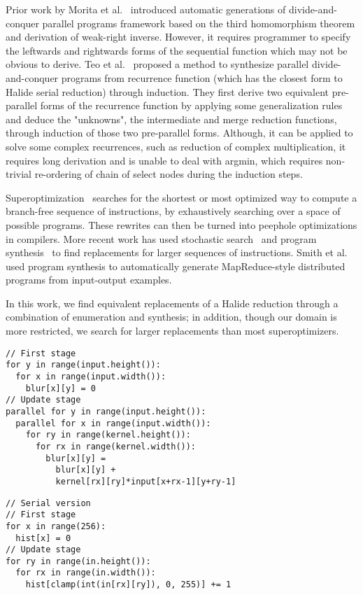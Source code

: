 Prior work by Morita et al.~\cite{Morita:2007:AIG:1250734.1250752} introduced automatic generations of divide-and-conquer parallel programs framework based on the third homomorphism theorem and derivation of weak-right inverse. However, it requires programmer to specify the leftwards and rightwards forms of the sequential function which may not be obvious to derive. Teo et al.~\cite{Teo:1997:DEP:266670.266697} proposed a method to synthesize parallel divide-and-conquer
programs from recurrence function (which has the closest form to Halide serial reduction) through induction. They first derive two equivalent pre-parallel forms of the recurrence function by applying some generalization rules and deduce the "unknowns", the intermediate and merge reduction functions, through induction of those two pre-parallel forms. Although, it can be applied to solve some complex recurrences, such as reduction of complex multiplication, it requires long derivation and is unable to deal with argmin, which requires non-trivial re-ordering of chain of select nodes during the induction steps. 

Superoptimization~\cite{Granlund:1992:EBU:143095.143146, Massalin:1987:SLS:36206.36194} searches for the shortest or most optimized way to compute a branch-free sequence of instructions, by exhaustively searching over a space of possible programs. These rewrites can then be turned into peephole optimizations in compilers. More recent work has used stochastic search~\cite{Phothilimthana:2016:SUS:2872362.2872387, Schkufza:2013:SS:2490301.2451150} and program synthesis~\cite{Lopes:2015:PCP:2737924.2737965} to find replacements for larger sequences of instructions. Smith et al.~\cite{Smith:2016:MPS:2908080.2908102} used program synthesis to automatically generate MapReduce-style distributed programs from input-output examples. 

In this work, we find equivalent replacements of a Halide reduction through a combination of enumeration and synthesis; in addition, though our domain is more restricted, we search for larger replacements than most superoptimizers.


\begin{lstlisting}[caption={Convolution blur kernel is easily parallelizable across \code{Var} $x$ adn $y$}, label={lst:blur_loopness}]
// First stage
for y in range(input.height()):
  for x in range(input.width()):
    blur[x][y] = 0
// Update stage
parallel for y in range(input.height()):
  parallel for x in range(input.width()):
    for ry in range(kernel.height()):
      for rx in range(kernel.width()):    
        blur[x][y] = 
          blur[x][y] + 
          kernel[rx][ry]*input[x+rx-1][y+ry-1] 
\end{lstlisting}

\begin{lstlisting}[caption={Histogram of an image is hard to parallelize since its update stage does not involve \code{RVar}s}, label={lst:histogram_loopness}]
// Serial version
// First stage
for x in range(256):
  hist[x] = 0
// Update stage
for ry in range(in.height()):
  for rx in range(in.width()):
    hist[clamp(int(in[rx][ry]), 0, 255)] += 1
\end{lstlisting}
